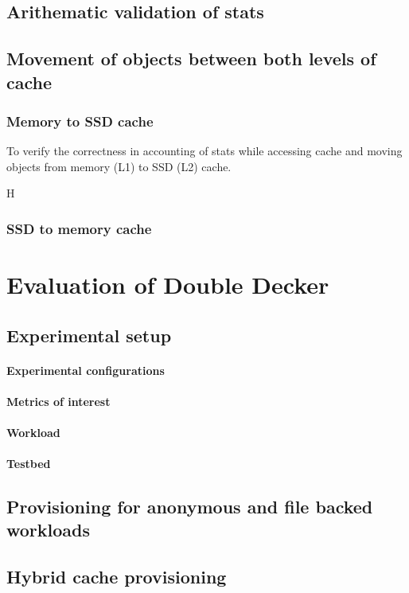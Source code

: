     \subsection{Arithematic validation of stats}
    
    \subsection{Movement of objects between both levels of cache}
	
	\subsubsection{Memory to SSD cache}

	    To verify the correctness in accounting of stats while accessing cache and moving objects from memory (L1) to SSD (L2) cache.
	    
	    H
	
	\subsubsection{SSD to memory cache}
    
  
  
  
  \section{Evaluation of Double Decker}
  
    \subsection{Experimental setup}
	
	\paragraph{Experimental configurations}
	
	\paragraph{Metrics of interest}
	
	\paragraph{Workload}
	
	\paragraph{Testbed}
  
    \subsection{Provisioning for anonymous and file backed workloads}
    
    \subsection{Hybrid cache provisioning}
    